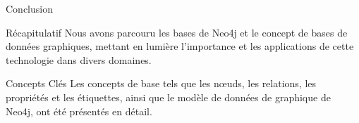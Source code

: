 \begin{frame}{Conclusion }
  \begin{block}{Récapitulatif}
    Nous avons parcouru les bases de Neo4j et le concept de bases de données graphiques, mettant en lumière l'importance et les applications de cette technologie dans divers domaines.
  \end{block}
  
  \begin{block}{Concepts Clés}
    Les concepts de base tels que les nœuds, les relations, les propriétés et les étiquettes, ainsi que le modèle de données de graphique de Neo4j, ont été présentés en détail.
  \end{block}
\end{frame}